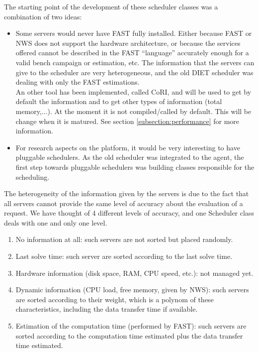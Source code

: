   The starting point of the development of these scheduler classes was a
  combination of two ideas:
  \begin{itemize}
  \item Some servers would never have FAST fully installed. Either because FAST or
  NWS does not support the hardware architecture, or because the services
  offered cannot be described in the FAST ``language'' accurately enough for a
  valid bench campaign or estimation, etc. The information that the servers can
  give to the scheduler are very heterogeneous, and the old DIET scheduler was
  dealing with only the FAST estimations.\\
  An other tool has been implemented, called CoRI, and will be used to get by 
  default the information and to get other types of information (total memory,...).
  At the moment it is not compiled/called by default. This will be change when
  it is matured. See section \ref{subsection:performance} for more information.
  \item For research aspects on the platform, it would be very interesting to
  have pluggable schedulers. As the old scheduler was integrated to the agent,
  the first step towards pluggable schedulers was building classes responsible
  for the scheduling.\\
  \end{itemize}

  The heterogeneity of the information given by the servers is due to the fact
  that all servers cannot provide the same level of accuracy about the evaluation
  of a request. We have thought of 4 different levels of accuracy, and one
  \textsf{Scheduler} class deals with one and only one level.
  \begin{enumerate}
  \item No information at all: such servers are not sorted but placed randomly.
  \item Last solve time: such server are sorted according to the last solve time.
  \item Hardware information (disk space, RAM, CPU speed, etc.): not managed yet.
  \item Dynamic information (CPU load, free memory, given by NWS): such servers
  are sorted according to their weight, which is a polynom of these
  characteristics, including the data transfer time if available.
  \item Estimation of the computation time (performed by FAST): such servers
  are sorted according to the computation time estimated plus the data transfer
  time estimated.
  \end{enumerate}

